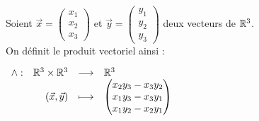 \begin{definition}
	Soient $\vec{x} = \begin{pmatrix} x_1 \\ x_2 \\ x_3 \end{pmatrix}$ et $\vec{y} = \begin{pmatrix} y_1 \\ y_2 \\ y_3 \end{pmatrix}$ deux vecteurs de $\mathbb{R}^3$.
	\\
	On définit le produit vectoriel ainsi :
	\begin{center}
		$
		\begin{array}{rrcl} \wedge : & \mathbb{R}^3 \times \mathbb{R}^3 & \longrightarrow & \mathbb{R}^3 \\ & (\vec{x}, \vec{y}) & \longmapsto & 
		\begin{pmatrix}
			x_2 y_3 - x_3 y_2 \\
			x_1 y_3 - x_3 y_1 \\
			x_1 y_2 - x_2 y_1
		\end{pmatrix}
		 \end{array}
		$
	\end{center}
\end{definition}
